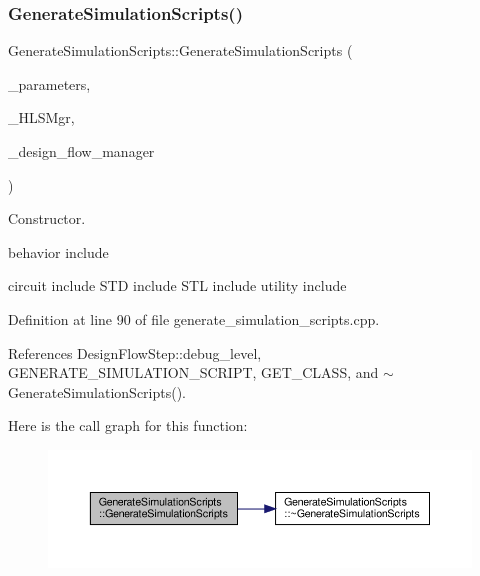 \subsubsection{\texorpdfstring{Generate\+Simulation\+Scripts()}{GenerateSimulationScripts()}}
{\footnotesize\ttfamily Generate\+Simulation\+Scripts\+::\+Generate\+Simulation\+Scripts (\begin{DoxyParamCaption}\item[{const \hyperlink{Parameter_8hpp_a37841774a6fcb479b597fdf8955eb4ea}{Parameter\+Const\+Ref}}]{\+\_\+parameters,  }\item[{const \hyperlink{hls__manager_8hpp_acd3842b8589fe52c08fc0b2fcc813bfe}{H\+L\+S\+\_\+manager\+Ref}}]{\+\_\+\+H\+L\+S\+Mgr,  }\item[{const Design\+Flow\+Manager\+Const\+Ref}]{\+\_\+design\+\_\+flow\+\_\+manager }\end{DoxyParamCaption})}



Constructor. 

behavior include

circuit include S\+TD include S\+TL include utility include 

Definition at line 90 of file generate\+\_\+simulation\+\_\+scripts.\+cpp.



References Design\+Flow\+Step\+::debug\+\_\+level, G\+E\+N\+E\+R\+A\+T\+E\+\_\+\+S\+I\+M\+U\+L\+A\+T\+I\+O\+N\+\_\+\+S\+C\+R\+I\+PT, G\+E\+T\+\_\+\+C\+L\+A\+SS, and $\sim$\+Generate\+Simulation\+Scripts().

Here is the call graph for this function\+:
\nopagebreak
\begin{figure}[H]
\begin{center}
\leavevmode
\includegraphics[width=350pt]{d4/d1b/classGenerateSimulationScripts_a9e5e2b9eacb44754a15a4120a84c083f_cgraph}
\end{center}
\end{figure}
\mbox{\label{classGenerateSimulationScripts_a381cd9df3c89a17d96b29d7f0c347411}} 
